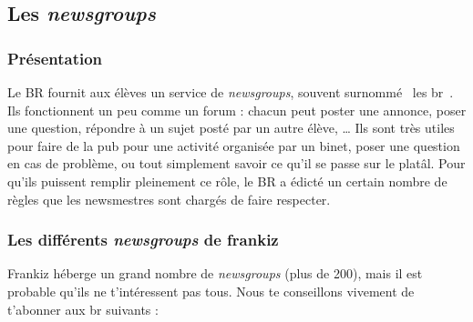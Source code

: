 \subsection{Les \emph{newsgroups}}
\label{newsgroups}
\subsubsection{Pr\'esentation}
Le BR fournit aux \'el\`eves un service de \emph{newsgroups}, souvent surnomm\'e \guillemotleft~les br~\guillemotright . Ils fonctionnent un peu comme un
forum : chacun peut poster une annonce, poser une question,
 r\'epondre \`a  un sujet post\'e par un autre \'el\`eve, \ldots 
Ils sont tr\`es utiles pour faire de la pub pour une activit\'e
organis\'ee par un binet, poser une question en cas de probl\`eme, ou
tout simplement savoir ce qu'il se passe sur le plat\^al. Pour qu'ils
puissent remplir pleinement ce r\^ole, le BR a \'edict\'e un certain
nombre de r\`egles que les newsmestres sont charg\'es de faire
respecter.

\subsubsection{Les diff\'erents \emph{newsgroups} de frankiz}
Frankiz h\'eberge un grand nombre de \emph{newsgroups} (plus de 200), mais il est probable qu'ils ne t'int\'eressent pas tous.
Nous te conseillons vivement de t'abonner aux br suivants :

